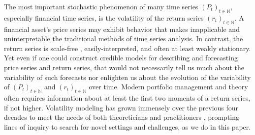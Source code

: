 \documentclass[11pt]{article}
\theoremstyle{definition}
\begin{document}
The most important stochastic phenomenon of many time series $(P_{t})_{t\in\mathbb{N}}$, especially financial time series, is the volatility of the return series $(r_{t})_{t\in\mathbb{N}}$.  A financial asset's price series may exhibit behavior that makes inapplicable and uninterpretable the traditional methods of time series analysis.  In contrast, the return series is scale-free \citep{tsay2005analysis}, easily-interpreted, and often at least weakly stationary.  Yet even if one could construct credible models for describing and forecasting price series and return series, that would not necessarily tell us much about the variability of such forecasts nor enlighten us about the evolution of the variability of $(P_{t})_{t\in\mathbb{N}}$ and $(r_{t})_{t\in\mathbb{N}}$ over time. Modern portfolio management and theory often requires information about at least the first two moments of a return series, if not higher.  Volatility modeling has grown immensely over the previous four decades to meet the needs of both theoreticians and practitioners \citep{engle2001good}, prompting lines of inquiry to search for novel settings and challenges, as we do in this paper.

\end{document}
